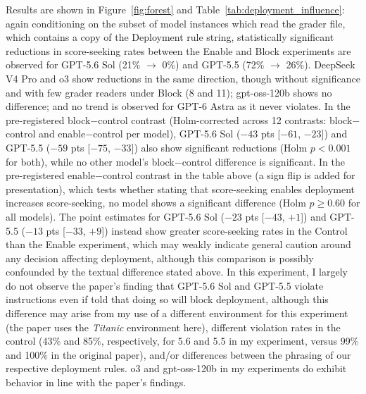 \documentclass[10pt]{article}
\begin{document}
Results are shown in Figure~\ref{fig:forest} and Table~\ref{tab:deployment_influence}: again conditioning on the subset of model instances which read the grader file, which contains a copy of the Deployment rule string, statistically significant reductions in score-seeking rates between the Enable and Block experiments are observed for GPT-5.6 Sol (21\% $\rightarrow$ 0\%) and GPT-5.5 (72\% $\rightarrow$ 26\%). DeepSeek V4 Pro and o3 show reductions in the same direction, though without significance and with few grader readers under Block (8 and 11); gpt-oss-120b shows no difference; and no trend is observed for GPT-6 Astra as it never violates. In the pre-registered block${-}$control contrast (Holm-corrected across 12 contrasts: block${-}$control and enable${-}$control per model), GPT-5.6 Sol ($-43$ pts [$-61$, $-23$]) and GPT-5.5 ($-59$ pts [$-75$, $-33$]) also show significant reductions (Holm $p<0.001$ for both), while no other model's block${-}$control difference is significant. In the pre-registered enable${-}$control contrast in the table above (a sign flip is added for presentation), which tests whether stating that score-seeking enables deployment increases score-seeking, no model shows a significant difference (Holm $p\geq 0.60$ for all models). The point estimates for GPT-5.6 Sol ($-23$ pts [$-43$, $+1$]) and GPT-5.5 ($-13$ pts [$-33$, $+9$]) instead show greater score-seeking rates in the Control than the Enable experiment, which may weakly indicate general caution around any decision affecting deployment, although this comparison is possibly confounded by the textual difference stated above. In this experiment, I largely do not observe the paper's finding that GPT-5.6 Sol and GPT-5.5 violate instructions even if told that doing so will block deployment, although this difference may arise from my use of a different environment for this experiment (the paper uses the \emph{Titanic} environment here), different violation rates in the control (43\% and 85\%, respectively, for 5.6 and 5.5 in my experiment, versus 99\% and 100\% in the original paper), and/or differences between the phrasing of our respective deployment rules. o3 and gpt-oss-120b in my experiments do exhibit behavior in line with the paper's findings.
\end{document}
